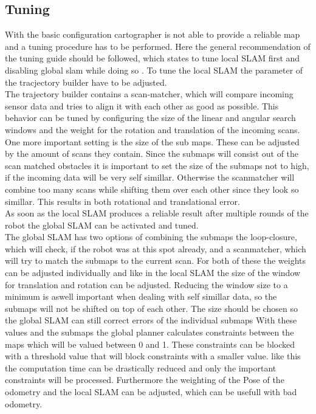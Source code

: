 \subsection{Tuning}
With the basic configuration cartographer is not able to provide a reliable map and a tuning procedure has to be performed. Here the general recommendation of the tuning guide should be followed, which states to tune local SLAM first and disabling global slam while doing so \cite{cartographertuning}.
To tune the local SLAM the parameter of the tracjectory builder have to be adjusted.\\
The trajectory builder contains a scan-matcher, which will compare incoming sensor data and tries to align it with each other as good as possible. This behavior can be tuned by configuring the size of the linear and angular search windows and the weight for the rotation and translation of the incoming scans.\\
One more important setting is the size of the sub maps. These can be adjusted by the amount of scans they contain. Since the submaps will consist out of the scan matched obstacles it is important to set the size of the submaps not to high, if the incoming data will be very self simillar. Otherwise the scanmatcher will combine too many scans while shifting them over each other since they look so simillar. This results in both rotational and translational error.\\
As soon as the local SLAM produces a reliable result after multiple rounds of the robot the global SLAM can be activated and tuned.\\

The global SLAM has two options of combining the submaps the loop-closure, which will check, if the robot was at this spot already, and a scanmatcher, which will try to match the submaps to the current scan. For both of these the weights can be adjusted individually and like in the local SLAM the size of the window for translation and rotation can be adjusted. Reducing the window size to a minimum is aswell important when dealing with self simillar data, so the submaps will not be shifted on top of each other. The size should be chosen so the global SLAM can still correct errors of the individual submaps 
With these values and the submaps the global planner calculates constraints between the maps which will be valued between 0 and 1. These constraints can be blocked with a threshold value that will block constraints with a smaller value. like this the computation time can be drastically reduced and only the important constraints will be processed. Furthermore the weighting of the Pose of the odometry and the local SLAM can be adjusted, which can be usefull with bad odometry.

